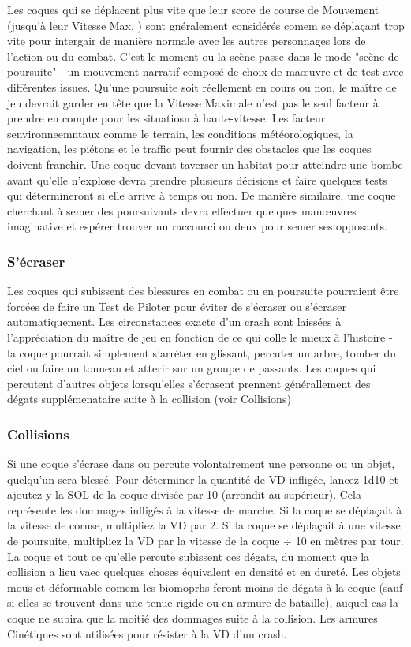 Les coques qui se déplacent plus vite que leur score de course de Mouvement (jusqu'à leur Vitesse Max. ) sont gnéralement considérés comem se déplaçant trop vite pour intergair de manière normale avec les autres personnages lors de l'action ou du combat. C'est le moment ou la scène passe dans le mode "scène de poursuite" - un mouvement narratif composé de choix de maœuvre et de test avec différentes issues. Qu'une poursuite soit réellement en cours ou non, le maître de jeu devrait garder en tête que la Vitesse Maximale n'est pas le seul facteur à prendre en compte pour les situatiosn à haute-vitesse. Les facteur senvironneemntaux comme le terrain, les conditions météorologiques, la navigation, les piétons et le traffic peut fournir des obstacles que les coques doivent franchir. Une coque devant taverser un habitat pour atteindre une bombe avant qu'elle n'explose devra prendre plusieurs décisions et faire quelques tests qui détermineront si elle arrive à temps ou non. De manière similaire, une coque cherchant à semer des poursuivants devra effectuer quelques manœuvres imaginative et espérer trouver un raccourci ou deux pour semer ses opposants. 

\subsubsection{S'écraser} 

Les coques qui subissent des blessures en combat ou en poursuite pourraient être forcées de faire un Test de Piloter pour éviter de s'écraser ou s'écraser automatiquement. Les circonstances exacte d'un crash sont laissées à l'appréciation du maître de jeu en fonction de ce qui colle le mieux à l'histoire - la coque pourrait simplement s'arréter en glissant, percuter un arbre, tomber du ciel ou faire un tonneau et atterir sur un groupe de passants. Les coques qui percutent d'autres objets lorsqu'elles s'écrasent prennent générallement des dégats supplémenataire suite à la collision (voir Collisions) 

\subsubsection{Collisions} 

Si une coque s'écrase dans ou percute volontairement une personne ou un objet, quelqu'un sera blessé. Pour déterminer la quantité de VD infligée, lancez 1d10 et ajoutez-y la SOL de la coque divisée par 10 (arrondit au supérieur). Cela représente les dommages infligés à la vitesse de marche. Si la coque se déplaçait à la vitesse de coruse, multipliez la VD par 2. Si la coque se déplaçait à une vitesse de poursuite, multipliez la VD par la vitesse de la coque $\div$ 10 en mètres par tour. La coque et tout ce qu'elle percute subissent ces dégats, du moment que la collision a lieu vaec quelques choses équivalent en densité et en dureté. Les objets mous et déformable comem les biomoprhs feront moins de dégats à la coque (sauf si elles se trouvent dans une tenue rigide ou en armure de bataille), auquel cas la coque ne subira que la moitié des dommages suite à la collision. Les armures Cinétiques sont utilisées pour résister à la VD d'un crash. 

